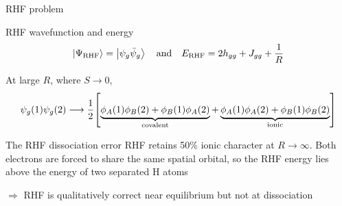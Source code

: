 \documentclass[aspectratio=169,9pt]{beamer}
\begin{document}
\begin{frame}{RHF problem}
	\begin{block}{RHF wavefunction and energy}
    	\begin{equation*}
    		\ket{\Psi_\text{RHF}}
    		=
    		\ket{\psi_g\Bar{\psi}_g}
    		\qand
    		E_\text{RHF}
    		=
    		2h_{gg}+J_{gg}+\frac{1}{R}
    	\end{equation*}
    
    	At large $R$, where $S\rightarrow0$,
    	\begin{equation*}
    		\psi_g(1)\psi_g(2)
    		\longrightarrow
    		\frac{1}{2}
    		\qty[
    			\underbrace{
    				\phi_A(1)\phi_B(2)+\phi_B(1)\phi_A(2)
    			}_{\text{covalent}}
    			+
    			\underbrace{
    				\phi_A(1)\phi_A(2)+\phi_B(1)\phi_B(2)
    			}_{\text{ionic}}
    		]
    	\end{equation*}
	\end{block}

	\begin{block}{The RHF dissociation error}
		RHF retains \alert{50\% ionic character} at $R\rightarrow\infty$.
		Both electrons are forced to share the same spatial orbital, so the RHF
		energy lies above the energy of two separated H atoms
	\end{block}
	\vfill
	\centering
	$\Rightarrow$ \alert{RHF is qualitatively correct near equilibrium but not at dissociation}
\end{frame}
\end{document}
